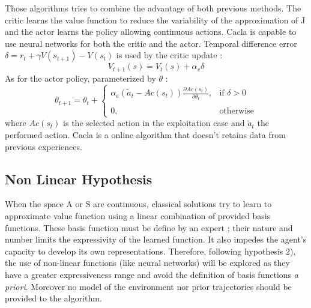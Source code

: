 Those algorithms \cite{Konda2003} tries to combine the advantage of both previous methods.
The critic learns the value function to reduce the variability of the approximation of J 
and the actor learns the policy allowing continuous actions.
Cacla \cite{VanHasselt2007a} is capable to use neural networks for both the critic and the actor.
Temporal difference error $\delta = r_t + \gamma V(s_{t+1}) - V(s_t)$ is used by the critic update :
\begin{equation}
 V_{t+1}(s) = V_t(s) + \alpha_v \delta
\end{equation}
As for the actor policy, parameterized by $\theta$ :
\begin{equation}
 \theta_{t+1} = \theta_t + 
 \begin{cases}
 \alpha_a (\widetilde{a}_t - Ac(s_t))
 \frac{\partial Ac(s_t)}{\partial \theta_t} , & \text{if } \delta > 0\\ \\
 0, & \text{otherwise}
 \end{cases}
\end{equation}
where $Ac(s_t)$ is the selected action in the exploitation case and $\widetilde{a}_t$ the performed action.
Cacla is a online algorithm that doesn't retains data from previous experiences. %


\subsection{Non Linear Hypothesis}

When the space A or S are continuous, classical solutions try to learn to approximate value function 
using a linear combination of provided basis functions. 
These basis function must be define by an expert ; their nature and number limits the expressivity 
of the learned function. It also impedes the agent's capacity to develop its own representations.
Therefore, following hypothesis 2), the use of non-linear functions (like neural networks) 
will be explored as they have a greater expressiveness range and avoid the definition of basis functions
{\it a priori}. Moreover no model of the environment nor prior trajectories should be provided to the algorithm.


